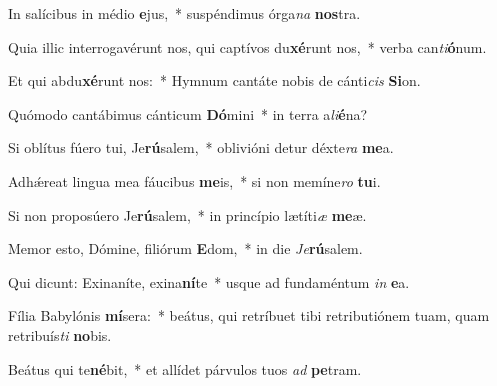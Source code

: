 \item In salícibus in médio \textbf{e}jus,~* suspéndimus órga\textit{na} \textbf{nos}tra.
\item Quia illic interrogavérunt nos, qui captívos du\textbf{xé}runt nos,~* verba can\textit{ti}\textbf{ó}num.
\item Et qui abdu\textbf{xé}runt nos:~* Hymnum cantáte nobis de cánti\textit{cis} \textbf{Si}on.
\item Quómodo cantábimus cánticum \textbf{Dó}mini~* in terra a\textit{li}\textbf{é}na?
\item Si oblítus fúero tui, Je\textbf{rú}salem,~* oblivióni detur déxte\textit{ra} \textbf{me}a.
\item Adhǽreat lingua mea fáucibus \textbf{me}is,~* si non memíne\textit{ro} \textbf{tu}i.
\item Si non proposúero Je\textbf{rú}salem,~* in princípio lætíti\textit{æ} \textbf{me}æ.
\item Memor esto, Dómine, filiórum \textbf{E}dom,~* in die \textit{Je}\textbf{rú}salem.
\item Qui dicunt: Exinaníte, exina\textbf{ní}te~* usque ad fundaméntum \textit{in} \textbf{e}a.
\item Fília Babylónis \textbf{mí}sera:~* beátus, qui retríbuet tibi retributiónem tuam, quam retribuís\textit{ti} \textbf{no}bis.
\item Beátus qui te\textbf{né}bit,~* et allídet párvulos tuos \textit{ad} \textbf{pe}tram.
